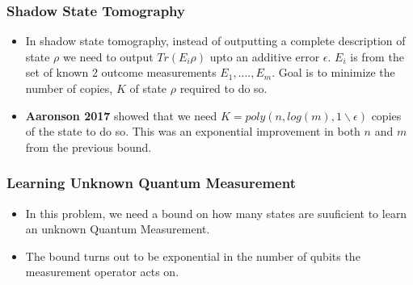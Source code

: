 \documentclass{beamer}
\begin{document}
\begin{frame}
\frametitle{Shadow State Tomography}

    \begin{itemize}

	\item In shadow state tomography, instead of outputting a complete description of state $\rho$ we need to output $Tr(E_i\rho)$ upto an additive error $\epsilon$. $E_i$ is from the set of known 2 outcome measurements ${E_1,....,E_m}$. Goal is to minimize the number of copies, $K$ of state $\rho$ required to do so. 

	\item \textbf{Aaronson 2017} showed that we need $K = {poly}(n, log(m), 1\backslash\epsilon)$ copies of the state to do so. This was an exponential improvement in both $n$ and $m$ from the previous bound.

    \end{itemize}
\end{frame}

\begin{frame}
\frametitle{Learning Unknown Quantum Measurement}

    \begin{itemize}

	\item In this problem, we need a bound on how many states are suuficient to learn an unknown Quantum Measurement.

	\item The bound turns out to be exponential in the number of qubits the measurement operator acts on.
    \end{itemize}
\end{frame}
\end{document}
